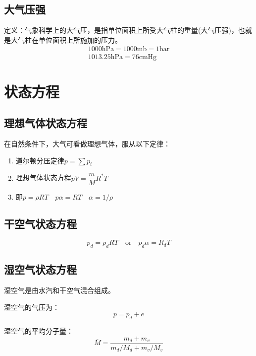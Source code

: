 \documentclass[UTF8,a4paper,11pt,oneside]{ctexbook}
\begin{document}
\subsection{大气压强}

定义：气象科学上的大气压，是指单位面积上所受大气柱的重量(大气压强)，也就是大气柱在单位面积上所施加的压力。
\begin{gather}
    1000\mathrm{hPa}=1000\mathrm{mb}=1\mathrm{bar}\\
    1013.25\mathrm{hPa}=76\mathrm{cmHg}
\end{gather}

\section{状态方程}

\subsection{理想气体状态方程}

在自然条件下，大气可看做理想气体，服从以下定律：
\begin{enumerate}
    \item 道尔顿分压定律\(p=\sum{}p_i\)
    \item 理想气体状态方程\(pV=\dfrac{m}{M}R^*T\)
    \item 即\(p=\rho{}RT\quad{}p\alpha=RT\quad{}\alpha=1/\rho\)
\end{enumerate}

\subsection{干空气状态方程}
\begin{equation}
p_d=\rho_dRT\quad{}\text{or}\quad{}p_d\alpha=R_dT
\end{equation}

\subsection{湿空气状态方程}

湿空气是由水汽和干空气混合组成。

湿空气的气压为：
\begin{equation}
    p=p_d+e
\end{equation}

湿空气的平均分子量：
\begin{equation}
    \overline{M}=\dfrac{m_d+m_v}{m_d/M_d+m_v/M_v}
\end{equation}
\end{document}

